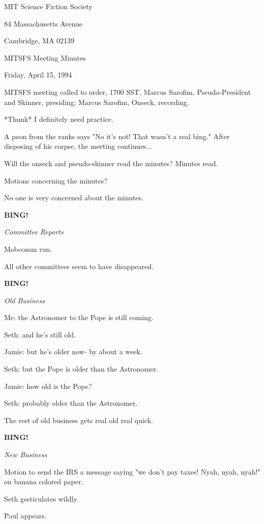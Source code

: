 \documentclass[12pt]{article}
\newcommand{\bing}{{\bf BING!} }
\newcommand{\goto}[1]{\bing \vskip 12pt \centerline{{\em{#1}}}}
\begin{document}
\begin{center}

MIT Science Fiction Society 

84 Massachusetts Avenue

Cambridge, MA 02139

\vspace{12pt}

MITSFS Meeting Minutes 

Friday, April 15, 1994

\end{center}
 
\vspace{18pt}

\setlength{\parskip}{6pt}

\noindent
MITSFS meeting called to order, 1700 SST,
Marcus Sarofim, Pseudo-President and Skinner, presiding; Marcus Sarofim, Onseck, recording.

*Thunk* I definitely need practice.

A peon from the ranks says "No it's not! That wasn't a real bing." After disposing of his corpse, the meeting continues...

Will the onseck and pseudo-skinner read the minutes? Minutes read.

Motions concerning the minutes?

No one is very concerned about the minutes.

\goto{Committee Reports}

Mobcomm run.

All other committees seem to have disappeared.

\goto{Old Business}

Me: the Astronomer to the Pope is still coming.

Seth: and he's still old.

Jamie: but he's older now- by about a week.

Seth: but the Pope is older than the Astronomer.

Jamie: how old is the Pope?

Seth: probably older than the Astronomer.

The rest of old business gets real old real quick.

\goto{New Business}

Motion to send the IRS a message saying "we don't pay taxes! Nyah, nyah, nyah!" on banana colored paper.

Seth gesticulates wildly.

Paul appears.
\end{document}
